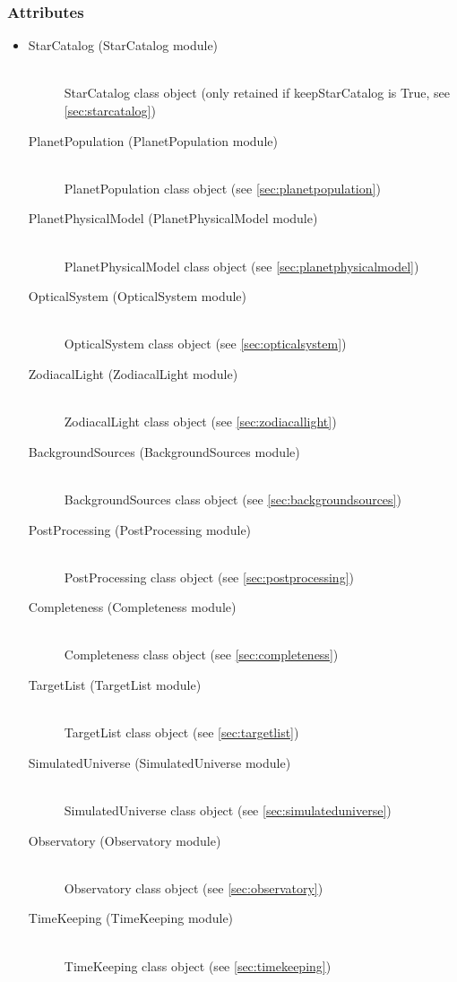 \documentclass[cleanfoot]{asme2ej}
\begin{document}
\subsubsection*{Attributes}
\begin{itemize}
\item
\begin{description}
    \item[StarCatalog (StarCatalog module)]\hfill \\ StarCatalog class object (only retained if keepStarCatalog is True, see \ref{sec:starcatalog})
    \item[PlanetPopulation (PlanetPopulation module)] \hfill \\ PlanetPopulation class object (see \ref{sec:planetpopulation})
    \item[PlanetPhysicalModel (PlanetPhysicalModel module)] \hfill \\ PlanetPhysicalModel class object (see \ref{sec:planetphysicalmodel})
    \item[OpticalSystem (OpticalSystem module)] \hfill \\ OpticalSystem class object (see \ref{sec:opticalsystem})
    \item[ZodiacalLight (ZodiacalLight module)] \hfill \\ ZodiacalLight class object (see \ref{sec:zodiacallight})
    \item[BackgroundSources (BackgroundSources module)] \hfill \\ BackgroundSources class object (see \ref{sec:backgroundsources})
    \item[PostProcessing (PostProcessing module)] \hfill \\ PostProcessing class object (see \ref{sec:postprocessing})
    \item[Completeness (Completeness module)] \hfill \\ Completeness class object (see \ref{sec:completeness})
    \item[TargetList (TargetList module)] \hfill \\ TargetList class object (see \ref{sec:targetlist})
    \item[SimulatedUniverse (SimulatedUniverse module)] \hfill \\ SimulatedUniverse class object (see \ref{sec:simulateduniverse})
    \item[Observatory (Observatory module)] \hfill \\ Observatory class object (see \ref{sec:observatory})
    \item[TimeKeeping (TimeKeeping module)] \hfill \\ TimeKeeping class object (see \ref{sec:timekeeping})

\end{description}
\end{itemize}
\end{document}
